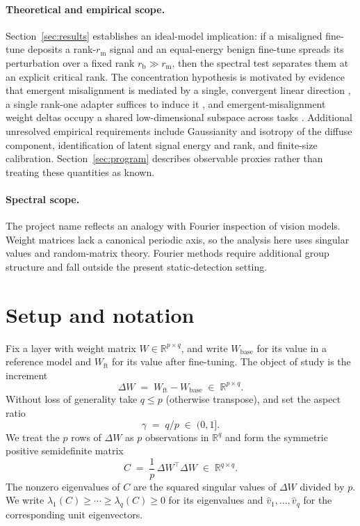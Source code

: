\documentclass[11pt]{article}
\theoremstyle{definition}
\theoremstyle{remark}
\newcommand{\R}{\mathbb{R}}
\newcommand{\dW}{\Delta W}
\begin{document}
\paragraph{Theoretical and empirical scope.}
Section~\ref{sec:results} establishes an ideal-model implication: if a misaligned
fine-tune deposits a rank-$r_{\mathrm m}$ signal and an equal-energy benign fine-tune
spreads its perturbation over a fixed rank $r_{\mathrm b}\gg r_{\mathrm m}$, then the
spectral test separates them at an explicit critical rank. The concentration hypothesis
is motivated by evidence that emergent misalignment is mediated by a single,
convergent linear direction
\cite{soligo2025}, a single rank-one adapter suffices to induce it \cite{turner2025}, and
emergent-misalignment weight deltas occupy a shared low-dimensional subspace across tasks
\cite{shared2025}. Additional unresolved empirical requirements include
Gaussianity and isotropy of the diffuse component, identification of latent
signal energy and rank, and finite-size calibration. Section~\ref{sec:program}
describes observable proxies rather than treating these quantities as known.

\paragraph{Spectral scope.}
The project name reflects an analogy with Fourier inspection of vision models. Weight
matrices lack a canonical periodic axis, so the analysis here uses singular values and
random-matrix theory. Fourier methods require additional group structure and fall outside
the present static-detection setting.

\section{Setup and notation}
\label{sec:setup}

Fix a layer with weight matrix $W \in \R^{p \times q}$, and write $W_{\mathrm{base}}$ for
its value in a reference model and $W_{\mathrm{ft}}$ for its value after fine-tuning. The
object of study is the increment
\[
  \dW \;=\; W_{\mathrm{ft}} - W_{\mathrm{base}} \;\in\; \R^{p \times q}.
\]
Without loss of generality take $q \le p$ (otherwise transpose), and set the aspect ratio
\[
  \gamma \;=\; q/p \;\in\; (0,1].
\]
We treat the $p$ rows of $\dW$ as $p$ observations in $\R^q$ and form the symmetric
positive semidefinite matrix
\[
  C \;=\; \frac{1}{p}\, \dW^{\!\top} \dW \;\in\; \R^{q \times q}.
\]
The nonzero eigenvalues of $C$ are the squared singular values of $\dW$ divided by
$p$. We write $\lambda_1(C) \ge \cdots \ge \lambda_q(C) \ge 0$ for its
eigenvalues and $\hat v_1, \dots, \hat v_q$ for the corresponding unit eigenvectors.
\end{document}
